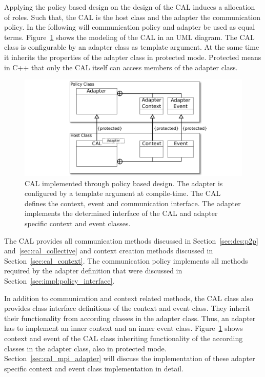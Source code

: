 Applying the policy based design on the design of the CAL induces a
allocation of roles. Such that, the CAL is the host class and the
adapter the communication policy. In the following will communication
policy and adapter be used as equal terms. Figure~\ref{fig:cal_uml}
shows the modeling of the CAL in an UML diagram. The CAL class is
configurable by an adapter class as template argument. At the same
time it inherits the properties of the adapter class in protected
mode. Protected means in C++ that only the CAL itself can access
members of the adapter class.

\begin{figure}[H]
  \centering \includegraphics[width=\textwidth]{graphics/40_cal_uml}
  \caption{CAL implemented through policy based design. The adapter is
    configured by a template argument at compile-time. The CAL defines
    the context, event and communication interface. The adapter
    implements the determined interface of the CAL and adapter specific
    context and event classes.}
  \label{fig:cal_uml}
\end{figure}

\noindent The CAL provides all communication methods discussed in
Section~\ref{sec:des:p2p} and~\ref{sec:cal_collective} and context
creation methods discussed in Section~\ref{sec:cal_context}. The
communication policy implements all methods required by the adapter
definition that were discussed in
Section~\ref{sec:impl:policy_interface}.

In addition to communication and context related methods, the CAL
class also provides class interface definitions of the context and
event class. They inherit their functionality from according classes
in the adapter class. Thus, an adapter has to implement an inner
context and an inner event class.  Figure~\ref{fig:cal_uml} shows
context and event of the CAL class inheriting functionality of the
according classes in the adapter class, also in protected
mode. Section~\ref{sec:cal_mpi_adapter} will discuss the
implementation of these adapter specific context and event class
implementation in detail.

